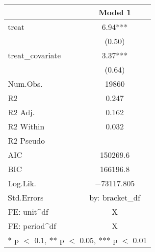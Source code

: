 \begin{table}
\centering
\begin{tabular}[t]{lc}
\toprule
  & Model 1\\
\midrule
treat & \num{6.94}***\\
 & (\num{0.50})\\
treat\_covariate & \num{3.37}***\\
 & (\num{0.64})\\
\midrule
Num.Obs. & \num{19860}\\
R2 & \num{0.247}\\
R2 Adj. & \num{0.162}\\
R2 Within & \num{0.032}\\
R2 Pseudo & \\
AIC & \num{150269.6}\\
BIC & \num{166196.8}\\
Log.Lik. & \num{-73117.805}\\
Std.Errors & by: bracket\_df\\
FE: unit^df & X\\
FE: period^df & X\\
\bottomrule
\multicolumn{2}{l}{\rule{0pt}{1em}* p $<$ 0.1, ** p $<$ 0.05, *** p $<$ 0.01}\\
\end{tabular}
\end{table}
